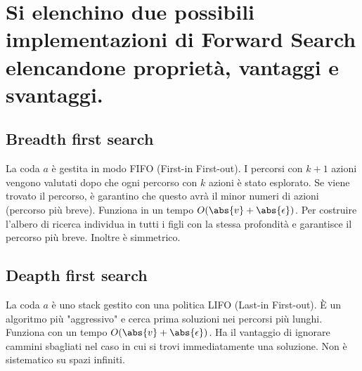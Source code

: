 \documentclass[\main/main.tex]{subfiles}
\begin{document}
\section{Si elenchino due possibili implementazioni di Forward Search elencandone proprietà, vantaggi e svantaggi.}

\subsection{Breadth first search}
La coda $a$ è gestita in modo FIFO (First-in First-out). I percorsi con $k+1$ azioni vengono valutati dopo che ogni percorso con $k$ azioni è stato esplorato. Se viene trovato il percorso, è garantino che questo avrà il minor numeri di azioni (percorso più breve). 
Funziona in un tempo $O(\abs{v}+ \abs{\epsilon})$.
Per costruire l'albero di ricerca individua in tutti i figli con la stessa profondità e garantisce il percorso più breve. Inoltre è simmetrico.

\subsection{Deapth first search}
La coda $a$ è uno stack gestito con una politica LIFO (Last-in First-out). È un algoritmo più "aggressivo" e cerca prima soluzioni nei percorsi più lunghi.
Funziona con un tempo $O(\abs{v}+ \abs{\epsilon})$.
Ha il vantaggio di ignorare cammini sbagliati nel caso in cui si trovi immediatamente una soluzione.
Non è sistematico su spazi infiniti.
\end{document}
